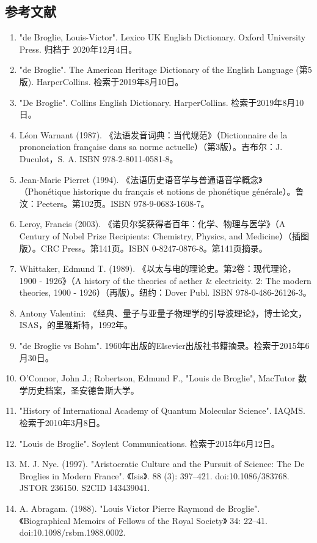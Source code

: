 \subsection{参考文献}
\begin{enumerate}
\item "de Broglie, Louis-Victor". Lexico UK English Dictionary. Oxford University Press. 归档于 2020年12月4日。
\item "de Broglie". The American Heritage Dictionary of the English Language (第5版). HarperCollins. 检索于2019年8月10日。
\item "De Broglie". Collins English Dictionary. HarperCollins. 检索于2019年8月10日。
\item Léon Warnant (1987). 《法语发音词典：当代规范》（Dictionnaire de la prononciation française dans sa norme actuelle）（第3版）。吉布尔：J. Duculot，S. A. ISBN 978-2-8011-0581-8。
\item Jean-Marie Pierret (1994). 《法语历史语音学与普通语音学概念》（Phonétique historique du français et notions de phonétique générale）。鲁汶：Peeters。第102页。ISBN 978-9-0683-1608-7。
\item Leroy, Francis (2003). 《诺贝尔奖获得者百年：化学、物理与医学》（A Century of Nobel Prize Recipients: Chemistry, Physics, and Medicine）（插图版）。CRC Press。第141页。ISBN 0-8247-0876-8。第141页摘录。
\item Whittaker, Edmund T. (1989). 《以太与电的理论史。第2卷：现代理论，1900 - 1926》（A history of the theories of aether & electricity. 2: The modern theories, 1900 - 1926）（再版）。纽约：Dover Publ. ISBN 978-0-486-26126-3。
\item Antony Valentini: 《经典、量子与亚量子物理学的引导波理论》，博士论文，ISAS，的里雅斯特，1992年。
\item "de Broglie vs Bohm". 1960年出版的Elsevier出版社书籍摘录。检索于2015年6月30日。
\item O'Connor, John J.; Robertson, Edmund F., "Louis de Broglie", MacTutor 数学历史档案，圣安德鲁斯大学。
\item "History of International Academy of Quantum Molecular Science". IAQMS. 检索于2010年3月8日。
\item "Louis de Broglie". Soylent Communications. 检索于2015年6月12日。
\item M. J. Nye. (1997). "Aristocratic Culture and the Pursuit of Science: The De Broglies in Modern France". 《Isis》. 88 (3): 397–421. doi:10.1086/383768. JSTOR 236150. S2CID 143439041.
\item A. Abragam. (1988). "Louis Victor Pierre Raymond de Broglie". 《Biographical Memoirs of Fellows of the Royal Society》 34: 22–41. doi:10.1098/rsbm.1988.0002.

\end{enumerate}
